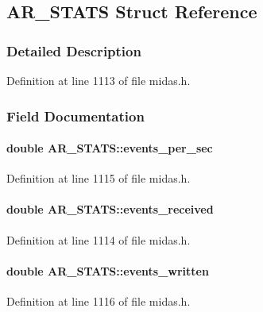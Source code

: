\subsection{AR\_\-STATS Struct Reference}
\label{structAR__STATS}


\subsubsection{Detailed Description}


Definition at line 1113 of file midas.h.

\subsubsection{Field Documentation}
\paragraph[{events\_\-per\_\-sec}]{\setlength{\rightskip}{0pt plus 5cm}double {\bf AR\_\-STATS::events\_\-per\_\-sec}}\hfill\label{structAR__STATS_a3695a89775259f076f838bf46af2e00f}


Definition at line 1115 of file midas.h.
\paragraph[{events\_\-received}]{\setlength{\rightskip}{0pt plus 5cm}double {\bf AR\_\-STATS::events\_\-received}}\hfill\label{structAR__STATS_ae75a481fd926f515b17a3e2b63ee283a}


Definition at line 1114 of file midas.h.
\paragraph[{events\_\-written}]{\setlength{\rightskip}{0pt plus 5cm}double {\bf AR\_\-STATS::events\_\-written}}\hfill\label{structAR__STATS_a142015e81c965f9e9fba58f5a6322525}


Definition at line 1116 of file midas.h.